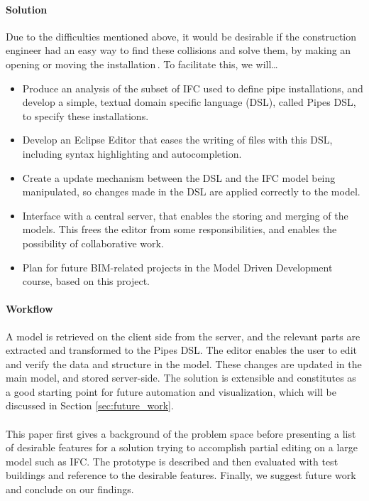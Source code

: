 \paragraph{Solution}
Due to the difficulties mentioned above, it would be desirable if the construction engineer had an easy way to find these collisions and solve them, by making an opening or moving the installation\,\cite{jorgensen12}. To facilitate this, we will…
\begin{itemize}
\item Produce an analysis of the subset of IFC used to define pipe installations, and develop a simple, textual domain specific language (DSL), called Pipes DSL, to specify these installations.
\item Develop an Eclipse Editor that eases the writing of files with this DSL, including syntax highlighting and autocompletion.
\item Create a update mechanism between the DSL and the IFC model being manipulated, so changes made in the DSL are applied correctly to the model.
\item Interface with a central server, that enables the storing and merging of the models. This frees the editor from some responsibilities, and enables the possibility of collaborative work.
\item Plan for future BIM-related projects in the Model Driven Development course, based on this project.
\end{itemize}

\paragraph{Workflow}
\label{sec:workflow}
A model is retrieved on the client side from the server, and the relevant parts are extracted and transformed to the Pipes DSL. The editor enables the user to edit and verify the data and structure in the model. These changes are updated in the main model, and stored server-side. The solution is extensible and constitutes as a good starting point for future automation and visualization, which will be discussed in Section \ref{sec:future_work}.

\paragraph{} 
This paper first gives a background of the problem space before presenting a list of desirable features for a solution trying to accomplish partial editing on a large model such as IFC. The prototype is described and then evaluated with test buildings and reference to the desirable features. Finally, we suggest future work and conclude on our findings.
